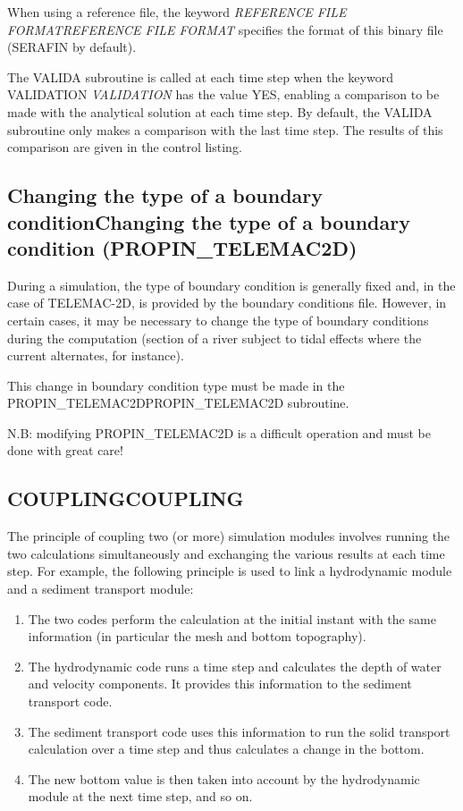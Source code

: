 \documentclass{article} %
\begin{document}
 When using a reference file, the keyword \textit{REFERENCE FILE FORMATREFERENCE FILE FORMAT} specifies the format of this binary file (SERAFIN by default).

 The VALIDA subroutine is called at each time step when the keyword VALIDATION \textit{VALIDATION} has the value YES, enabling a comparison to be made with the analytical solution at each time step. By default, the VALIDA subroutine only makes a comparison with the last time step. The results of this comparison are given in the control listing.


\subsection{ Changing the type of a boundary conditionChanging the type of a boundary condition (PROPIN\_TELEMAC2D)}

 During a simulation, the type of boundary condition is generally fixed and, in the case of TELEMAC-2D, is provided by the boundary conditions file. However, in certain cases, it may be necessary to change the type of boundary conditions during the computation (section of a river subject to tidal effects where the current alternates, for instance).

 This change in boundary condition type must be made in the PROPIN\_TELEMAC2DPROPIN\_TELEMAC2D subroutine.

 N.B: modifying PROPIN\_TELEMAC2D is a difficult operation and must be done with great care!


\subsection{ COUPLINGCOUPLING}

 The principle of coupling two (or more) simulation modules involves running the two calculations simultaneously and exchanging the various results at each time step. For example, the following principle is used to link a hydrodynamic module and a sediment transport module:

\begin{enumerate}
\item  The two codes perform the calculation at the initial instant with the same information (in particular the mesh and bottom topography).

\item  The hydrodynamic code runs a time step and calculates the depth of water and velocity components. It provides this information to the sediment transport code.

\item  The sediment transport code uses this information to run the solid transport calculation over a time step and thus calculates a change in the bottom.

\item  The new bottom value is then taken into account by the hydrodynamic module at the next time step, and so on.
\end{enumerate}
\end{document}
